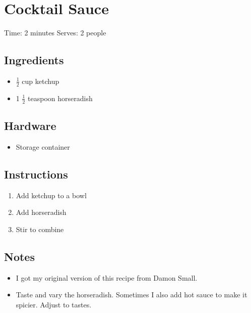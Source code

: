 \section{Cocktail Sauce}
\label{cocktailSauce}
\setcounter{secnumdepth}{0}
Time: 2 minutes
Serves: 2 people

\begin{multicols}{2}
\subsection*{Ingredients}
\begin{itemize}
    \item \( \frac{1}{2} \) cup ketchup
    \item 1 \( \frac{1}{2} \) teaspoon horseradish
\end{itemize}

\subsection*{Hardware}
\begin{itemize}
    \item Storage container
\end{itemize}
\clearpage

\subsection*{Instructions}
\begin{enumerate}
    \item Add ketchup to a bowl
    \item Add horseradish
    \item Stir to combine
\end{enumerate}

\subsection*{Notes}
\begin{itemize}
    \item I got my original version of this recipe from Damon Small.
    \item Taste and vary the horseradish. Sometimes I also add hot sauce to make it spicier.  Adjust to tastes.
\end{itemize}
\end{multicols}
\clearpage